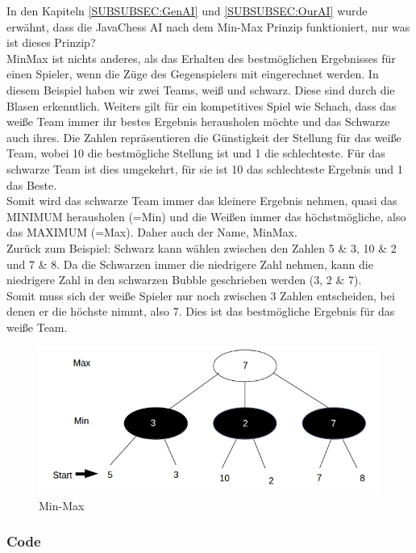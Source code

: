 \documentclass[12pt,a4paper]{article}
\begin{document}
{In den Kapiteln \ref{SUBSUBSEC:GenAI} und \ref{SUBSUBSEC:OurAI} wurde erwähnt, dass die JavaChess AI nach dem Min-Max Prinzip funktioniert, nur was ist dieses Prinzip?\\[2ex]
MinMax ist nichts anderes, als das Erhalten des bestmöglichen Ergebnisses für einen Spieler, wenn die Züge des Gegenspielers mit eingerechnet werden. In diesem Beispiel haben wir zwei Teams, weiß und schwarz. Diese sind durch die Blasen erkenntlich. Weiters gilt für ein kompetitives Spiel wie Schach, dass das weiße Team immer ihr bestes Ergebnis herausholen möchte und das Schwarze auch ihres. Die Zahlen repräsentieren die Günstigkeit der Stellung für das weiße Team, wobei 10 die bestmögliche Stellung ist und 1 die schlechteste. Für das schwarze Team ist dies umgekehrt, für sie ist 10 das schlechteste Ergebnis und 1 das Beste. \\
Somit wird das schwarze Team immer das kleinere Ergebnis nehmen, quasi das MINIMUM herausholen (=Min) und die Weißen immer das höchstmögliche, also das MAXIMUM (=Max). Daher auch der Name, MinMax. \\
Zurück zum Beispiel: Schwarz kann wählen zwischen den Zahlen 5 \& 3, 10 \& 2 und 7 \& 8. Da die Schwarzen immer die niedrigere Zahl nehmen, kann die niedrigere Zahl in den schwarzen Bubble geschrieben werden (3, 2 \& 7). \\
Somit muss sich der weiße Spieler nur noch zwischen 3 Zahlen entscheiden, bei denen er die höchste nimmt, also 7. Dies ist das bestmögliche Ergebnis für das weiße Team.
\begin{figure}[H]
  \centering
   	\includegraphics[width=16cm]{graphics/MinMax.jpg}
  \caption{Min-Max}
  \label{FIG:MINMAX}
\end{figure}

\newpage
\subsubsection{Code}
\label{SUBSUBSEC:AICODE}

}
\end{document}
